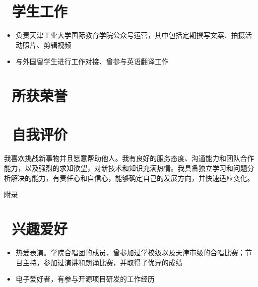 \documentclass{resume}
\begin{document}
\section{\faBriefcase\ 学生工作}
\begin{onehalfspacing}
    \begin{itemize}
      \item 负责天津工业大学国际教育学院公众号运营，其中包括定期撰写文案、拍摄活动照片、剪辑视频
      \item 与外国留学生进行工作对接、曾参与英语翻译工作
    \end{itemize}
    \end{onehalfspacing}

\section{\faHeartO\ 所获荣誉}

\section{\faInfo\ 自我评价}
\begin{onehalfspacing}
    \large 我喜欢挑战新事物并且愿意帮助他人。我有良好的服务态度、沟通能力和团队合作能力，以及强烈的求知欲望，对新技术和知识充满热情。我具备独立学习和问题分析解决的能力，有责任心和自信心，能够确定自己的发展方向，并快速适应变化。
\end{onehalfspacing}


\newpage 
\begin{center}
\LARGE 附录
\end{center}


\section{\faFlag\ 兴趣爱好}
\begin{itemize}[parsep=0.5ex]
  \item 热爱表演。学院合唱团的成员，曾参加过学校级以及天津市级的合唱比赛；节目主持，参加过演讲和朗诵比赛，并取得了优异的成绩
  \item 电子爱好者，有参与开源项目研发的工作经历
\end{itemize}
\end{document}
